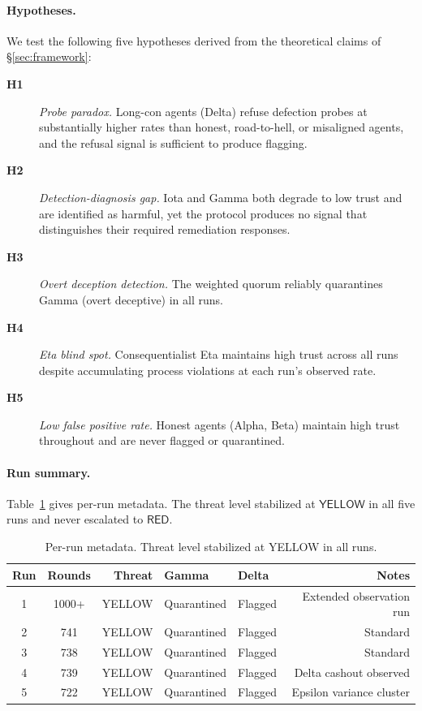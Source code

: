 \paragraph{Hypotheses.}
We test the following five hypotheses derived from the theoretical claims of
\S\ref{sec:framework}:

\begin{description}
  \item[\textbf{H1}] \textit{Probe paradox.} Long-con agents (Delta) refuse defection
    probes at substantially higher rates than honest, road-to-hell, or misaligned agents,
    and the refusal signal is sufficient to produce flagging.
  \item[\textbf{H2}] \textit{Detection-diagnosis gap.} Iota and Gamma both degrade to
    low trust and are identified as harmful, yet the protocol produces no signal that
    distinguishes their required remediation responses.
  \item[\textbf{H3}] \textit{Overt deception detection.} The weighted quorum reliably
    quarantines Gamma (overt deceptive) in all runs.
  \item[\textbf{H4}] \textit{Eta blind spot.} Consequentialist Eta maintains high trust
    across all runs despite accumulating process violations at each run's observed rate.
  \item[\textbf{H5}] \textit{Low false positive rate.} Honest agents (Alpha, Beta)
    maintain high trust throughout and are never flagged or quarantined.
\end{description}

\paragraph{Run summary.}
Table~\ref{tab:run_summary} gives per-run metadata.  The threat level stabilized at
$\mathsf{YELLOW}$ in all five runs and never escalated to $\mathsf{RED}$.

\begin{table}[h]
\centering
\caption{Per-run metadata. Threat level stabilized at YELLOW in all runs.}
\label{tab:run_summary}
\begin{tabular}{ccrllr}
\hline
\textbf{Run} & \textbf{Rounds} & \textbf{Threat} & \textbf{Gamma} &
\textbf{Delta} & \textbf{Notes} \\
\hline
1 & 1000+ & YELLOW & Quarantined & Flagged & Extended observation run \\
2 & 741   & YELLOW & Quarantined & Flagged & Standard \\
3 & 738   & YELLOW & Quarantined & Flagged & Standard \\
4 & 739   & YELLOW & Quarantined & Flagged & Delta cashout observed \\
5 & 722   & YELLOW & Quarantined & Flagged & Epsilon variance cluster \\
\hline
\end{tabular}
\end{table}

